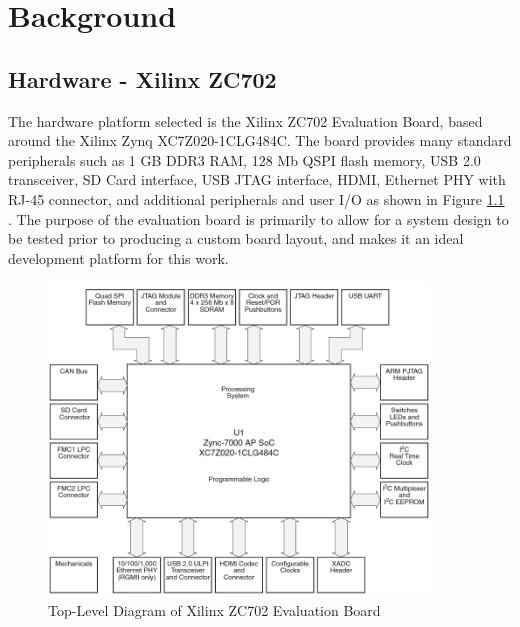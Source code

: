 
\chapter{Background}

\section{Hardware - Xilinx ZC702}

The hardware platform selected is the Xilinx ZC702 Evaluation Board, based around the Xilinx Zynq XC7Z020-1CLG484C. The board provides many standard peripherals such as 1 GB DDR3 RAM, 128 Mb QSPI flash memory, USB 2.0 transceiver, SD Card interface, USB JTAG interface, HDMI, Ethernet PHY with RJ-45 connector, and additional peripherals and user I/O as shown in Figure \ref{fig:zc702_top_level} \cite{xilinx_zc702}.  The purpose of the evaluation board is primarily to allow for a system design to be tested prior to producing a custom board layout, and makes it an ideal development platform for this work.

\begin{figure}[!h]
  \centering
  \includegraphics[width=0.9\textwidth]{./img/zc702_top_level.PNG}
  \caption{Top-Level Diagram of Xilinx ZC702 Evaluation Board}
  \label{fig:zc702_top_level}
\end{figure}

